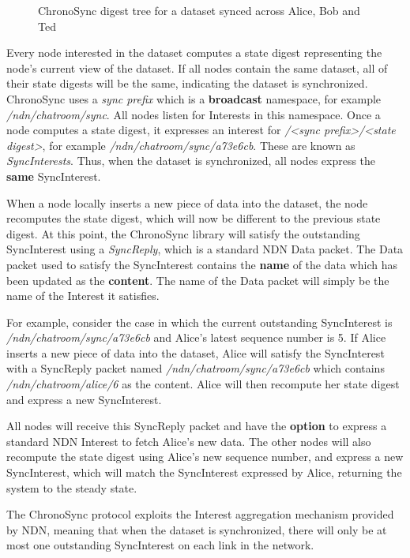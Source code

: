\begin{figure}[H]
    \centering
    \caption{ChronoSync digest tree for a dataset synced across Alice, Bob and Ted \cite{chronosync}}
    \label{fig:chronosync-digest-tree}
\end{figure}

Every node interested in the dataset computes a state digest representing the node's current view of the dataset. If all nodes contain the same dataset, all of their state digests will be the same, indicating the dataset is synchronized. ChronoSync uses a \textit{sync prefix} which is a \textbf{broadcast} namespace, for example \textit{/ndn/chatroom/sync}. All nodes listen for Interests in this namespace. Once a node computes a state digest, it expresses an interest for \textit{/<sync prefix>/<state digest>}, for example \textit{/ndn/chatroom/sync/a73e6cb}. These are known as \textit{SyncInterests}. Thus, when the dataset is synchronized, all nodes express the \textbf{same} SyncInterest.

When a node locally inserts a new piece of data into the dataset, the node recomputes the state digest, which will now be different to the previous state digest. At this point, the ChronoSync library will satisfy the outstanding SyncInterest using a \textit{SyncReply}, which is a standard NDN Data packet. The Data packet used to satisfy the SyncInterest contains the \textbf{name} of the data which has been updated as the \textbf{content}. The name of the Data packet will simply be the name of the Interest it satisfies. 

For example, consider the case in which the current outstanding SyncInterest is \textit{/ndn/chatroom/sync/a73e6cb} and Alice's latest sequence number is 5. If Alice inserts a new piece of data into the dataset, Alice will satisfy the SyncInterest with a SyncReply packet named \textit{/ndn/chatroom/sync/a73e6cb} which contains \textit{/ndn/chatroom/alice/6} as the content. Alice will then recompute her state digest and express a new SyncInterest.

All nodes will receive this SyncReply packet and have the \textbf{option} to express a standard NDN Interest to fetch Alice's new data. The other nodes will also recompute the state digest using Alice's new sequence number, and express a new SyncInterest, which will match the SyncInterest expressed by Alice, returning the system to the steady state.

The ChronoSync protocol exploits the Interest aggregation mechanism provided by NDN, meaning that when the dataset is synchronized, there will only be at most one outstanding SyncInterest on each link in the network. 

